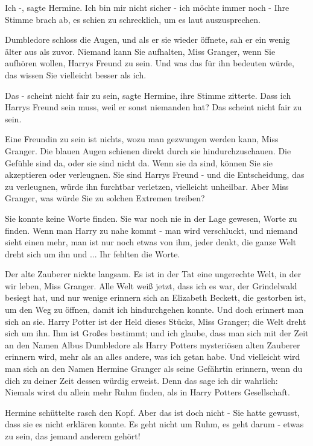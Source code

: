 \glqq{}Ich -\grqq{}, sagte Hermine. \glqq{}Ich bin mir nicht sicher - ich möchte
immer noch -\grqq{} Ihre Stimme brach ab, es schien zu schrecklich, um es laut
auszusprechen.

Dumbledore schloss die Augen, und als er sie wieder öffnete, sah er ein wenig
älter aus als zuvor. \glqq{}Niemand kann Sie aufhalten, Miss Granger, wenn Sie
aufhören wollen, Harrys Freund zu sein. Und was das für ihn bedeuten würde, das
wissen Sie vielleicht besser als ich.\grqq{}

\glqq{}Das - scheint nicht fair zu sein\grqq{}, sagte Hermine, ihre Stimme
zitterte. \glqq{}Dass ich Harrys Freund sein muss, weil er sonst niemanden hat?
Das scheint nicht fair zu sein.\grqq{}

\glqq{}Eine Freundin zu sein ist nichts, wozu man gezwungen werden kann, Miss
Granger.\grqq{} Die blauen Augen schienen direkt durch sie hindurchzuschauen.
\glqq{}Die Gefühle sind da, oder sie sind nicht da. Wenn sie da sind, können Sie
sie akzeptieren oder verleugnen. Sie sind Harrys Freund - und die Entscheidung,
das zu verleugnen, würde ihn furchtbar verletzen, vielleicht unheilbar. Aber
Miss Granger, was würde Sie zu solchen Extremen treiben?\grqq{}

Sie konnte keine Worte finden. Sie war noch nie in der Lage gewesen, Worte zu
finden. \glqq{}Wenn man Harry zu nahe kommt - man wird verschluckt, und niemand
sieht einen mehr, man ist nur noch etwas von ihm, jeder denkt, die ganze Welt
dreht sich um ihn und ...\grqq{} Ihr fehlten die Worte.

Der alte Zauberer nickte langsam. \glqq{}Es ist in der Tat eine ungerechte Welt,
in der wir leben, Miss Granger. Alle Welt weiß jetzt, dass ich es war, der
Grindelwald besiegt hat, und nur wenige erinnern sich an Elizabeth Beckett, die
gestorben ist, um den Weg zu öffnen, damit ich hindurchgehen konnte. Und doch
erinnert man sich an sie. Harry Potter ist der Held dieses Stücks, Miss Granger;
die Welt dreht sich um ihn. Ihm ist Großes bestimmt; und ich glaube, dass man
sich mit der Zeit an den Namen Albus Dumbledore als Harry Potters mysteriösen
alten Zauberer erinnern wird, mehr als an alles andere, was ich getan habe. Und
vielleicht wird man sich an den Namen Hermine Granger als seine Gefährtin
erinnern, wenn du dich zu deiner Zeit dessen würdig erweist. Denn das sage ich
dir wahrlich: Niemals wirst du allein mehr Ruhm finden, als in Harry Potters
Gesellschaft.\grqq{}

Hermine schüttelte rasch den Kopf. \glqq{}Aber das ist doch nicht -\grqq{} Sie
hatte gewusst, dass sie es nicht erklären konnte. \glqq{}Es geht nicht um Ruhm,
es geht darum - etwas zu sein, das jemand anderem gehört!\grqq{}

